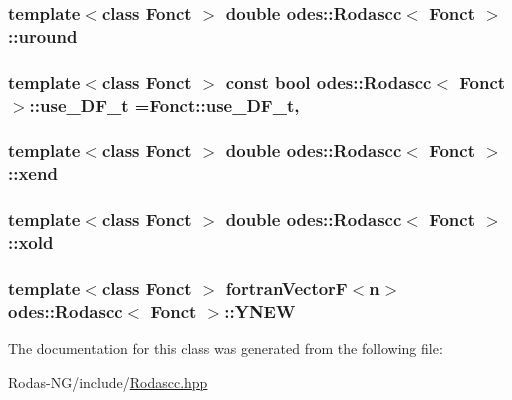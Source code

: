 \hypertarget{classodes_1_1Rodascc_a4c618beb34a76a22ca6a7985f2fcf7c6}{
\subsubsection[{uround}]{\setlength{\rightskip}{0pt plus 5cm}template$<$class Fonct $>$ double {\bf odes\-::\-Rodascc}$<$ Fonct $>$\-::uround\hspace{0.3cm}{\ttfamily [private]}}}\label{classodes_1_1Rodascc_a4c618beb34a76a22ca6a7985f2fcf7c6}
\hypertarget{classodes_1_1Rodascc_a6b5e12269c7ab02716bb18a61082061b}{
\subsubsection[{use\-\_\-\-D\-F\-\_\-t}]{\setlength{\rightskip}{0pt plus 5cm}template$<$class Fonct $>$ const bool {\bf odes\-::\-Rodascc}$<$ Fonct $>$\-::use\-\_\-\-D\-F\-\_\-t =Fonct\-::use\-\_\-\-D\-F\-\_\-t\hspace{0.3cm}{\ttfamily [static]}, {\ttfamily [private]}}}\label{classodes_1_1Rodascc_a6b5e12269c7ab02716bb18a61082061b}
\hypertarget{classodes_1_1Rodascc_a2eb8ff91b3102e3f2a1dd394b6f61e47}{
\subsubsection[{xend}]{\setlength{\rightskip}{0pt plus 5cm}template$<$class Fonct $>$ double {\bf odes\-::\-Rodascc}$<$ Fonct $>$\-::xend\hspace{0.3cm}{\ttfamily [private]}}}\label{classodes_1_1Rodascc_a2eb8ff91b3102e3f2a1dd394b6f61e47}
\hypertarget{classodes_1_1Rodascc_a7ca4ca099d84ae781f63da8cc62fa295}{
\subsubsection[{xold}]{\setlength{\rightskip}{0pt plus 5cm}template$<$class Fonct $>$ double {\bf odes\-::\-Rodascc}$<$ Fonct $>$\-::xold\hspace{0.3cm}{\ttfamily [private]}}}\label{classodes_1_1Rodascc_a7ca4ca099d84ae781f63da8cc62fa295}
\hypertarget{classodes_1_1Rodascc_a1debb48babfbc57a0c7c086e5680e526}{
\subsubsection[{Y\-N\-E\-W}]{\setlength{\rightskip}{0pt plus 5cm}template$<$class Fonct $>$ {\bf fortran\-Vector\-F}$<${\bf n}$>$ {\bf odes\-::\-Rodascc}$<$ Fonct $>$\-::Y\-N\-E\-W\hspace{0.3cm}{\ttfamily [private]}}}\label{classodes_1_1Rodascc_a1debb48babfbc57a0c7c086e5680e526}


The documentation for this class was generated from the following file\-:\begin{DoxyCompactItemize}
\item 
Rodas-\/\-N\-G/include/\hyperlink{Rodascc_8hpp}{Rodascc.\-hpp}\end{DoxyCompactItemize}
